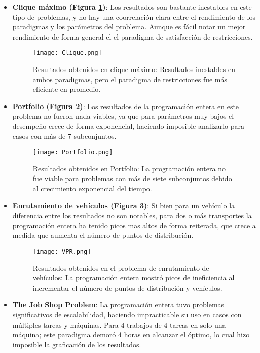 \documentclass[12pt]{report}
\begin{document}
\begin{itemize}
\newpage

    \item \textbf{Clique máximo (Figura \ref{fig:Clique})}: Los resultados son bastante inestables en este tipo de problemas, y no hay una coorrelación clara entre el rendimiento de los paradigmas y los parámetros del problema. Aunque es fácil notar un mejor rendimiento de forma general el el paradigma de satisfacción de restricciones. 
    \begin{figure}[ht]
    \centering
    \texttt{[image: Clique.png]}
    \caption{Resultados obtenidos en clique máximo: Resultados inestables en ambos paradigmas, pero el paradigma de restricciones fue más eficiente en promedio.}
    \label{fig:Clique}
    \end{figure}

\newpage

    \item \textbf{Portfolio (Figura \ref{fig:Portfolio})}: Los resultados de la programación entera en este problema no fueron nada viables, ya que para parámetros muy bajos el desempeño crece de forma exponencial, haciendo imposible analizarlo para casos con más de 7 subconjuntos.
    \begin{figure}[ht]
    \centering
    \texttt{[image: Portfolio.png]}
    \caption{Resultados obtenidos en Portfolio: La programación entera no fue viable para problemas con más de siete subconjuntos debido al crecimiento exponencial del tiempo.}
    \label{fig:Portfolio}
    \end{figure}

\newpage

    \item \textbf{Enrutamiento de vehículos (Figura \ref{fig:VPR})}: Si bien para un vehículo la diferencia entre los resultados no son notables, para dos o más transportes la programación entera ha tenido picos mas altos de forma reiterada, que crece a medida que aumenta el número de puntos de distribución.
    \begin{figure}[ht]
    \centering
    \texttt{[image: VPR.png]}
    \caption{Resultados obtenidos en el problema de enrutamiento de vehículos: La programación entera mostró picos de ineficiencia al incrementar el número de puntos de distribución y vehículos.}
    \label{fig:VPR}
    \end{figure}

\newpage
    
    \item \textbf{The Job Shop Problem}: La programación entera tuvo problemas significativos de escalabilidad, haciendo impracticable su uso en casos con múltiples tareas y máquinas. Para 4 trabajos de 4 tareas en solo una máquina; este paradigma demoró 4 horas en alcanzar el óptimo, lo cual hizo imposible la graficación de los resultados.



\end{itemize}
\end{document}
